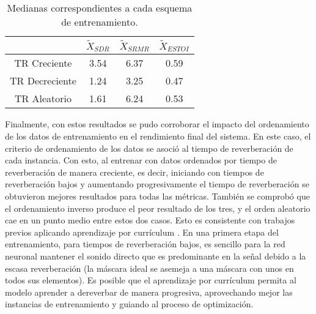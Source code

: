 \begin{table}[H]
\centering
\caption{Medianas correspondientes a cada esquema de entrenamiento.}
\begin{tabular}{|c|c|c|c|}
\hline
               & \textbf{$\tilde{X}_{SDR}$} & \textbf{$\tilde{X}_{SRMR}$} & \textbf{$\tilde{X}_{ESTOI}$} \\ \hline
TR Creciente   & 3.54         & 6.37          & 0.59           \\ \hline
TR Decreciente & 1.24         & 3.25          & 0.47           \\ \hline
TR Aleatorio   & 1.61         & 6.24          & 0.53           \\ \hline
\end{tabular}
\label{table:resultados_reverb}
\end{table}

Finalmente, con estos resultados se pudo corroborar el impacto del ordenamiento de los datos de entrenamiento en el rendimiento final del sistema. En este caso, el criterio de ordenamiento de los datos se asoció al tiempo de reverberación de cada instancia. Con esto, al entrenar con datos ordenados por tiempo de reverberación de manera creciente, es decir, iniciando con tiempos de reverberación bajos y aumentando progresivamente el tiempo de reverberación se obtuvieron mejores resultados para todas las métricas. También se comprobó que el ordenamiento inverso produce el peor resultado de los tres, y el orden aleatorio cae en un punto medio entre estos dos casos. Esto es consistente con trabajos previos aplicando aprendizaje por currículum \cite{cl1, cl2}. En una primera etapa del entrenamiento, para tiempos de reverberación bajos, es sencillo para la red neuronal mantener el sonido directo que es predominante en la señal debido a la escasa reverberación (la máscara ideal se asemeja a una máscara con unos en todos sus elementos). Es posible que el aprendizaje por currículum permita al modelo aprender a dereverbar de manera progresiva, aprovechando mejor las instancias de entrenamiento y guiando al proceso de optimización.
